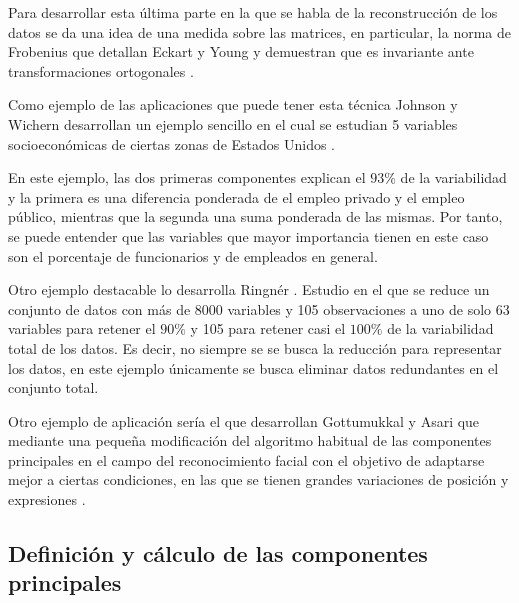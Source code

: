 \noindent Para desarrollar esta última parte en la que se habla de la reconstrucción de los datos se da una idea de una medida sobre las matrices, en particular, la norma de Frobenius que detallan Eckart y Young y demuestran que es invariante ante transformaciones ortogonales \cite{Eckart 1936}.

\noindent Como ejemplo de las aplicaciones que puede tener esta técnica Johnson y Wichern  desarrollan un ejemplo sencillo en el cual se estudian 5 variables socioeconómicas de ciertas zonas de Estados Unidos \cite{Johnson 2007}.

\noindent En este ejemplo, las dos primeras componentes explican el $93\%$ de la variabilidad y la primera es una diferencia ponderada de el empleo privado y el empleo público, mientras que la segunda una suma ponderada de las mismas. Por tanto, se puede entender que las variables que mayor importancia tienen en este caso son el porcentaje de funcionarios y de empleados en general.

\noindent Otro ejemplo destacable lo desarrolla Ringnér \cite{Ringnér 2008}. Estudio en el que se reduce un conjunto de datos con más de 8000 variables y 105 observaciones a uno de solo 63 variables para retener el $90\%$ y 105 para retener casi el $100\%$ de la variabilidad total de los datos. Es decir, no siempre se se busca la reducción para representar los datos, en este ejemplo únicamente se busca eliminar datos redundantes en el conjunto total. 

\noindent Otro ejemplo de aplicación sería el que desarrollan Gottumukkal y Asari que mediante una pequeña modificación del algoritmo habitual de las componentes principales en el campo del reconocimiento facial con el objetivo de adaptarse mejor a ciertas condiciones, en las que se tienen grandes variaciones de posición y expresiones \cite {Asari 2004}.

\subsection{Definición y cálculo de las componentes principales}

